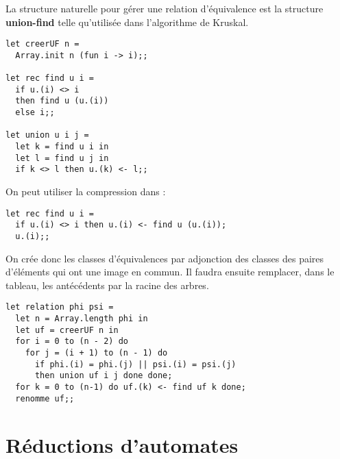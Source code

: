\begin{Exercise}
La structure naturelle pour gérer une relation d'équivalence  est la structure {\bf union-find} telle qu'utilisée dans l'algorithme de Kruskal.
\begin{lstlisting}
let creerUF n = 
  Array.init n (fun i -> i);; 
  
let rec find u i = 
  if u.(i) <> i 
  then find u (u.(i)) 
  else i;;
  
let union u i j = 
  let k = find u i in 
  let l = find u j in 
  if k <> l then u.(k) <- l;;
\end{lstlisting}

On peut utiliser la compression dans  :
\begin{lstlisting}
let rec find u i = 
  if u.(i) <> i then u.(i) <- find u (u.(i));
  u.(i);;
\end{lstlisting}

\newpage

On crée donc les classes d'équivalences par adjonction des classes des paires d'éléments qui ont une image en commun. Il faudra ensuite remplacer, dans le tableau, les antécédents par la racine des arbres.

\begin{lstlisting}
let relation phi psi =
  let n = Array.length phi in
  let uf = creerUF n in
  for i = 0 to (n - 2) do
    for j = (i + 1) to (n - 1) do
      if phi.(i) = phi.(j) || psi.(i) = psi.(j) 
      then union uf i j done done;
  for k = 0 to (n-1) do uf.(k) <- find uf k done;
  renomme uf;;
\end{lstlisting}

\end{Exercise}
\section{Réductions d'automates}
